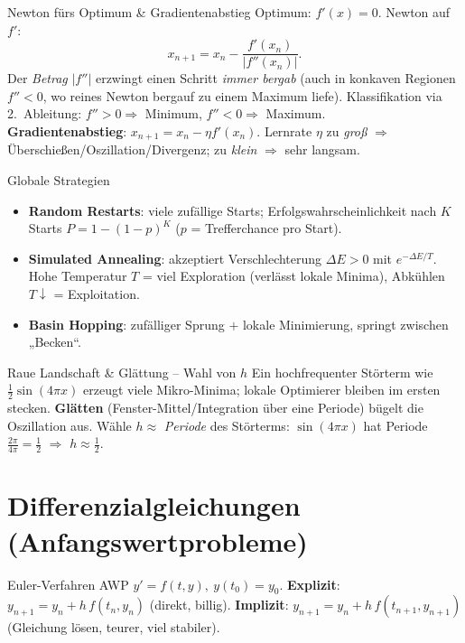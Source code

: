 \documentclass[a4paper,11pt]{article}
\begin{document}
\begin{satz}{Newton fürs Optimum \& Gradientenabstieg}
Optimum: $f'(x)=0$. Newton auf $f'$:
\[
  x_{n+1}=x_n-\frac{f'(x_n)}{|f''(x_n)|}.
\]
Der \emph{Betrag} $|f''|$ erzwingt einen Schritt \emph{immer bergab} (auch in konkaven Regionen
$f''<0$, wo reines Newton bergauf zu einem Maximum liefe). Klassifikation via 2.\ Ableitung:
$f''>0\Rightarrow$ Minimum, $f''<0\Rightarrow$ Maximum.\\
\textbf{Gradientenabstieg}: $x_{n+1}=x_n-\eta f'(x_n)$. Lernrate $\eta$ zu \emph{groß}
$\Rightarrow$ Überschießen/Oszillation/Divergenz; zu \emph{klein} $\Rightarrow$ sehr langsam.
\end{satz}

\begin{satz}{Globale Strategien}
\begin{itemize}
\item \textbf{Random Restarts}: viele zufällige Starts; Erfolgswahrscheinlichkeit nach $K$ Starts
  $P=1-(1-p)^K$ ($p$ = Trefferchance pro Start).
\item \textbf{Simulated Annealing}: akzeptiert Verschlechterung $\Delta E>0$ mit
  $e^{-\Delta E/T}$. Hohe Temperatur $T$ = viel Exploration (verlässt lokale Minima), Abkühlen
  $T\downarrow$ = Exploitation.
\item \textbf{Basin Hopping}: zufälliger Sprung $+$ lokale Minimierung, springt zwischen „Becken``.
\end{itemize}
\end{satz}

\begin{falle}{Raue Landschaft \& Glättung -- Wahl von $h$}
Ein hochfrequenter Störterm wie $\tfrac12\sin(4\pi x)$ erzeugt viele Mikro-Minima; lokale
Optimierer bleiben im ersten stecken. \textbf{Glätten} (Fenster-Mittel/Integration über eine
Periode) bügelt die Oszillation aus. Wähle $h\approx$ \emph{Periode} des Störterms:
$\sin(4\pi x)$ hat Periode $\frac{2\pi}{4\pi}=\tfrac12$ $\Rightarrow$ $h\approx\tfrac12$.
\end{falle}

\section{Differenzialgleichungen (Anfangswertprobleme)}

\begin{defi}{Euler-Verfahren}
AWP $y'=f(t,y),\ y(t_0)=y_0$.
\textbf{Explizit}: $y_{n+1}=y_n+h\,f(t_n,y_n)$ (direkt, billig).
\textbf{Implizit}: $y_{n+1}=y_n+h\,f(t_{n+1},y_{n+1})$ (Gleichung lösen, teurer, viel stabiler).
\end{defi}
\end{document}
